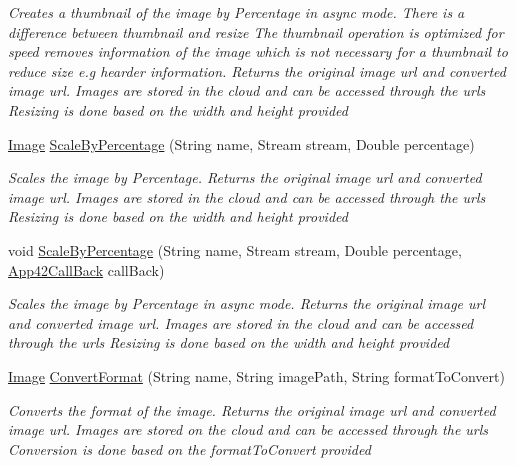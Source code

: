 \begin{DoxyCompactItemize}
\begin{DoxyCompactList}\small\item\em Creates a thumbnail of the image by Percentage in async mode. There is a difference between thumbnail and resize The thumbnail operation is optimized for speed removes information of the image which is not necessary for a thumbnail to reduce size e.\+g hearder information. Returns the original image url and converted image url. Images are stored in the cloud and can be accessed through the urls Resizing is done based on the width and height provided \end{DoxyCompactList}\item 
\hyperlink{classcom_1_1shephertz_1_1app42_1_1paas_1_1sdk_1_1csharp_1_1image_processor_1_1_image}{Image} \hyperlink{classcom_1_1shephertz_1_1app42_1_1paas_1_1sdk_1_1csharp_1_1image_processor_1_1_image_processor_service_abe8eb6f5f6310194b07e462d8942fa42}{Scale\+By\+Percentage} (String name, Stream stream, Double percentage)
\begin{DoxyCompactList}\small\item\em Scales the image by Percentage. Returns the original image url and converted image url. Images are stored in the cloud and can be accessed through the urls Resizing is done based on the width and height provided \end{DoxyCompactList}\item 
void \hyperlink{classcom_1_1shephertz_1_1app42_1_1paas_1_1sdk_1_1csharp_1_1image_processor_1_1_image_processor_service_ac8d23463a575d400dbb215442980f744}{Scale\+By\+Percentage} (String name, Stream stream, Double percentage, \hyperlink{interfacecom_1_1shephertz_1_1app42_1_1paas_1_1sdk_1_1csharp_1_1_app42_call_back}{App42\+Call\+Back} call\+Back)
\begin{DoxyCompactList}\small\item\em Scales the image by Percentage in async mode. Returns the original image url and converted image url. Images are stored in the cloud and can be accessed through the urls Resizing is done based on the width and height provided \end{DoxyCompactList}\item 
\hyperlink{classcom_1_1shephertz_1_1app42_1_1paas_1_1sdk_1_1csharp_1_1image_processor_1_1_image}{Image} \hyperlink{classcom_1_1shephertz_1_1app42_1_1paas_1_1sdk_1_1csharp_1_1image_processor_1_1_image_processor_service_a61506a532f3d7720e3135a6ef41af336}{Convert\+Format} (String name, String image\+Path, String format\+To\+Convert)
\begin{DoxyCompactList}\small\item\em Converts the format of the image. Returns the original image url and converted image url. Images are stored on the cloud and can be accessed through the urls Conversion is done based on the format\+To\+Convert provided \end{DoxyCompactList}\item 

\end{DoxyCompactItemize}
